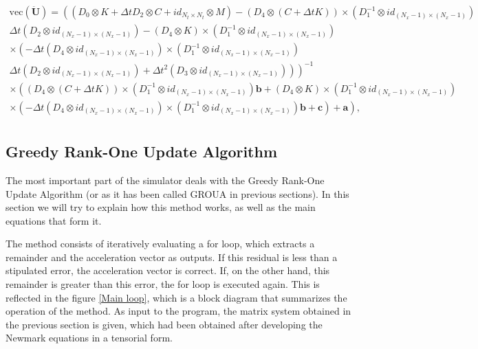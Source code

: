 \documentclass{ws-m3as}
\begin{document}
$$
\begin{array}{c}
\mathrm{vec}(\ddot{\mathbf{U}}) = \left(\left(D_0 \otimes K + \Delta t D_2 \otimes C + id_{N_t \times N_t} \otimes  M  \right) - \left(D_4 \otimes  \left(C+\Delta t K\right)\right) \times \left( D_1^{-1} \otimes  id_{(N_x-1)\times(N_x-1)}\right)   \right.\\
\left. \Delta t \left( D_2 \otimes  id_{(N_x-1)\times(N_x-1)}\right) -  \left( D_4 \otimes   K \right) \times \left( D_1^{-1} \otimes  id_{(N_x-1)\times(N_x-1)}\right) \right. \\
\left.  \times \left( - \Delta t \left(D_4 \otimes  id_{(N_x-1)\times(N_x-1)} \right) \times \left( D_1^{-1} \otimes  id_{(N_x-1)\times(N_x-1)}\right) \right. \right. \\
\left. \left. \Delta t \left( D_2 \otimes  id_{(N_x-1)\times(N_x-1)}\right)  + \Delta t^2 \left( D_3 \otimes  id_{(N_x-1)\times(N_x-1)} \right) \right) \right)^{-1} \\
\times \left( \left(D_4 \otimes  \left( C + \Delta t K\right) \right) \times \left( D_1^{-1} \otimes  id_{(N_x-1)\times(N_x-1)}\right)  \mathbf{b} +\left( D_4 \otimes   K\right) \times \left( D_1^{-1} \otimes  id_{(N_x-1)\times(N_x-1)}\right) \right. \\
\left.  \times \left( - \Delta t \left(D_4 \otimes  id_{(N_x-1)\times(N_x-1)} \right) \times \left( D_1^{-1} \otimes  id_{(N_x-1)\times(N_x-1)}\right) \mathbf{b}  + \mathbf{c}  \right) + \mathbf{a}  \right), \\
\end{array}
$$




\subsection{Greedy Rank-One Update Algorithm}

The most important part of the simulator deals with the Greedy Rank-One Update Algorithm (or as it has been called GROUA in previous sections). In this section we will try to explain how this method works, as well as the main equations that form it.

The method consists of iteratively evaluating a for loop, which extracts a remainder and the acceleration vector as outputs. If this residual is less than a stipulated error, the acceleration vector is correct. If, on the other hand, this remainder is greater than this error, the for loop is executed again. This is reflected in the figure \ref{Main loop}, which is a block diagram that summarizes the operation of the method. As input to the program, the matrix system obtained in the previous section is given, which had been obtained after developing the Newmark equations in a tensorial form.
\end{document}
